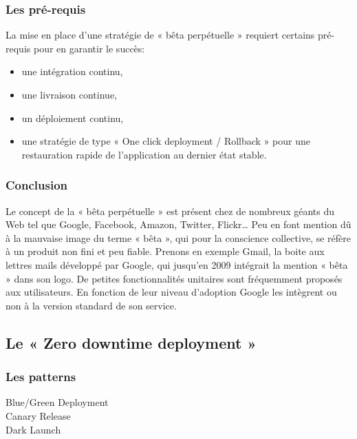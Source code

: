 \documentclass{report}
\begin{document}
        \subsubsection{Les pré-requis}
        La mise en place d’une stratégie de « bêta perpétuelle » requiert certains pré-requis pour en garantir le succès:\\
        \begin{itemize}
          \item une intégration continu,
          \item une livraison continue,
          \item un déploiement continu,
          \item une stratégie de type « One click deployment / Rollback » pour une restauration rapide de l’application au dernier état stable.\\
        \end{itemize}

        \subsubsection{Conclusion}
        Le concept de la « bêta perpétuelle » est présent chez de nombreux géants du Web tel que Google, Facebook, Amazon, Twitter, Flickr… Peu en font mention dû à la mauvaise image du terme « bêta », qui pour la conscience collective, se réfère à un produit non fini et peu fiable. Prenons en exemple Gmail, la boite aux lettres mails développé par Google, qui jusqu’en 2009 intégrait la mention « bêta » dans son logo. De petites fonctionnalités unitaires sont fréquemment proposés aux utilisateurs. En fonction de leur niveau d’adoption Google les intègrent ou non à la version standard de son service.

        \subsection{Le « Zero downtime deployment »}

          \subsubsection{Les patterns}
          Blue/Green Deployment\\

          Canary Release\\

          Dark Launch\\
\end{document}
